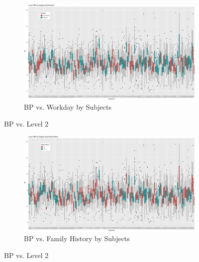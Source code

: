 \documentclass[12pt,twoside,letterpaper]{article}
\theoremstyle{definition}
\theoremstyle{definition}
\begin{document}
\begin{appendices}
    \begin{figure}[h] \ContinuedFloat
        \centering
        \begin{subfigure}[b]{\textwidth}
            \centering
            \includegraphics[width=\textwidth]{pics/bp by id and day.png}
            \caption{BP vs. Workday by Subjects}
            \label{fig: bp v id and day}
        \end{subfigure}
        \caption{BP vs. Level 2}
        \label{fig: bp v id and level2_2}
    \end{figure}

    \begin{figure}[h] \ContinuedFloat
        \centering
        \begin{subfigure}[b]{\textwidth}
            \centering
            \includegraphics[width=\textwidth]{pics/bp by id and fh.png}
            \caption{BP vs. Family History by Subjects}
            \label{fig: bp v id and fh}
        \end{subfigure}
        \caption{BP vs. Level 2}
        \label{fig: bp v id and level2_3}
    \end{figure}


\end{appendices}
\end{document}
